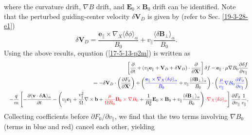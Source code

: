 \documentclass{article}
\newcommand{\tmcolor}[2]{{\color{#1}{#2}}}
\begin{document}
where the curvature drift, $\nabla B$ drift, and $\mathbf{E}_0 \times
\mathbf{B}_0$ drift can be identified. Note that the perturbed guiding-center
velocity $\delta \mathbf{V}_D$ is given by (refer to Sec. \ref{19-3-28-e1})
\begin{equation}
  \delta \mathbf{V}_D = \frac{\mathbf{e}_{\parallel} \times \nabla_X \langle
  \delta \phi \rangle_{\alpha}}{B_0} + v_{\parallel} \frac{\langle \delta
  \mathbf{B}_{\perp} \rangle_{\alpha}}{B_0} .
\end{equation}
Using the above results, equation (\ref{17-5-13-p2m}) is written as
\begin{eqnarray}
  &  & \left[ \frac{\partial}{\partial t} + (v_{\parallel}
  \mathbf{e}_{\parallel} +\mathbf{V}_D + \delta \mathbf{V}_D) \cdot
  \frac{\partial}{\partial \mathbf{X}'} \right] \delta f
  -\mathbf{e}_{\parallel} \cdot \mu \nabla B_0 \frac{\partial \delta
  f}{\partial v_{\parallel}} \nonumber\\
  &  & = - \delta \mathbf{V}_D \cdot \left( \frac{\partial F_0}{\partial
  \mathbf{X}'} \right) + \left( \tmcolor{blue}{\frac{\mathbf{e}_{\parallel}
  \times \nabla_X \langle \delta \phi \rangle_{\alpha}}{B_0}} + v_{\parallel}
  \frac{\langle \delta \mathbf{B}_{\perp} \rangle_{\alpha}}{B_0} \right) \cdot
  \left( \tmcolor{blue}{\frac{\mu}{v_{\parallel}} \nabla B_0 \frac{\partial
  F_0}{\partial v_{\parallel}}} \right) \nonumber\\
  &  & - \frac{q}{m} \left[ - \frac{\partial \langle \mathbf{v} \cdot \delta
  \mathbf{A} \rangle_{\alpha}}{\partial t} - \left( v_{\parallel}
  \mathbf{e}_{\parallel} + \frac{v_{\parallel}^2}{\Omega} \nabla \times
  \mathbf{b}+ \tmcolor{red}{\frac{\mu}{\Omega B_0} \mathbf{B}_0 \times \nabla
  B_0} + \frac{1}{B_0^2} \mathbf{E}_0 \times \mathbf{B}_0 + v_{\parallel}
  \frac{\langle \delta \mathbf{B}_{\perp} \rangle_{\alpha}}{B_0} \right)
  \tmcolor{red}{\cdot \nabla_X \langle \delta \phi \rangle_{\alpha}} \right]
  \frac{\partial F_0}{\partial v_{\parallel}}  \frac{1}{v_{\parallel}}, 
\end{eqnarray}
Collecting coefficients before $\partial F_0 / \partial v_{\parallel}$, we
find that the two terms involving $\nabla B_0$ (terms in blue and red) cancel
each other, yielding
\end{document}

